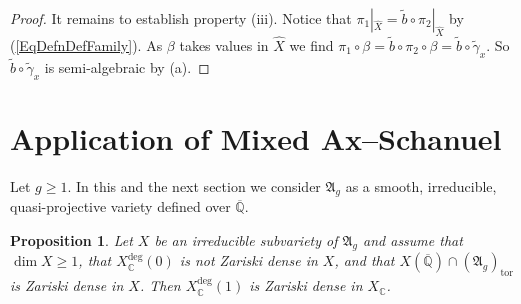 \documentclass[12pt,oneside]{amsart}
\newcounter{maincounter}
\numberwithin{maincounter}{section}
\numberwithin{equation}{section}
\newtheorem{proposition}[maincounter]{Proposition}
\def\CC{\mathbb{C}}
\def\QQ{\mathbb{Q}}
\newcommand{\IC}{{\CC}}
\newcommand{\IQbar}{{\overline{\QQ}}}
\begin{document}
\begin{proof}
It remains to establish property (iii). Notice that
$\pi_1|_{\hat X} = \tilde b \circ \pi_2|_{\hat X}$ by
(\ref{EqDefnDefFamily}).
As $\beta$ takes values in $\hat X$ we find
$\pi_1\circ\beta = \tilde b \circ\pi_2\circ\beta = \tilde b
\circ\tilde \gamma_x$. So $\tilde b \circ\tilde\gamma_x$ is
semi-algebraic by (a). 
\end{proof}



\section{Application of Mixed Ax--Schanuel}
\label{SectionAppAS}
Let $g\ge 1$. In this and the next section we consider
$\mathfrak{A}_g$ as a smooth, irreducible, quasi-projective variety
defined over $\IQbar$.

\begin{proposition}\label{PropXIsDeg1}
  Let $X$ be an irreducible subvariety of
  $\mathfrak{A}_g$ and assume that
  $\dim X\ge 1$, that $X_\IC^{\mathrm{deg}}(0)$ is not Zariski dense
  in $X$, and that $X(\IQbar)\cap
  (\mathfrak{A}_g)_{\mathrm{tor}}$ is Zariski dense in $X$.
  Then $X_\IC^{\mathrm{deg}}(1)$ is Zariski dense in $X_\IC$.
\end{proposition}
\end{document}
